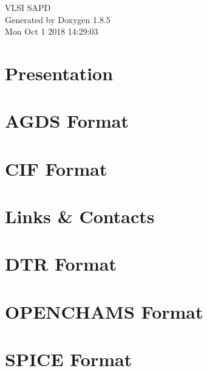 \documentclass[twoside]{book}
\newcommand{\clearemptydoublepage}{%
  \newpage{\pagestyle{empty}\cleardoublepage}%
}
\begin{document}
\hypersetup{pageanchor=false}
\begin{titlepage}
\vspace*{7cm}
\begin{center}%
{\Large V\-L\-S\-I S\-A\-P\-D }\\
\vspace*{1cm}
{\large Generated by Doxygen 1.8.5}\\
\vspace*{0.5cm}
{\small Mon Oct 1 2018 14:29:03}\\
\end{center}
\end{titlepage}
\clearemptydoublepage
\tableofcontents
\clearemptydoublepage
{}
\hypersetup{pageanchor=true}

\chapter{Presentation}
\label{index}\hypertarget{index}{}
\chapter{A\-G\-D\-S Format}
\label{agds}
\hypertarget{agds}{}

\chapter{C\-I\-F Format}
\label{cif}
\hypertarget{cif}{}

\chapter{Links \& Contacts}
\label{contact}
\hypertarget{contact}{}

\chapter{D\-T\-R Format}
\label{dtr}
\hypertarget{dtr}{}

\chapter{O\-P\-E\-N\-C\-H\-A\-M\-S Format}
\label{openchams}
\hypertarget{openchams}{}

\chapter{S\-P\-I\-C\-E Format}
\label{spice}
\hypertarget{spice}{}

\end{document}
